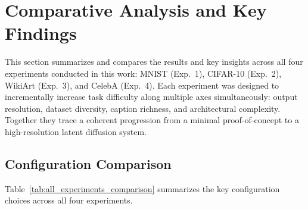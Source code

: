 
\section{Comparative Analysis and Key Findings}
\label{sec:comparative_analysis}

This section summarizes and compares the results and key insights across all four experiments conducted in this work: MNIST (Exp.\ 1), CIFAR-10 (Exp.\ 2), WikiArt (Exp.\ 3), and CelebA (Exp.\ 4). Each experiment was designed to incrementally increase task difficulty along multiple axes simultaneously: output resolution, dataset diversity, caption richness, and architectural complexity. Together they trace a coherent progression from a minimal proof-of-concept to a high-resolution latent diffusion system.

\subsection{Configuration Comparison}

Table~\ref{tab:all_experiments_comparison} summarizes the key configuration choices across all four experiments.

